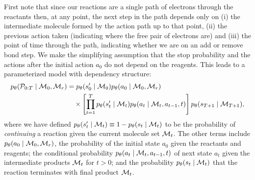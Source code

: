 First note that since our reactions are a single path of electrons through the reactants then, at any point, the next step in the path depends only on (i) the intermediate molecule formed by the action path up to that point, (ii) the previous action taken (indicating where the free pair of electrons are) and (iii) the point of time through the path, indicating whether we are on an add or remove bond step. 
We make the simplifying assumption that the stop probability and the actions after the initial action $a_0$ do not depend on the reagents. This leads to a parameterized model with dependency structure:
\begin{align}
\label{eq:jointprob}
p_\theta({\mathcal{P}}_{0:T} \mid {\mathcal{M}}_0, {\mathcal{M}}_r) 
&=
	p_\theta(s'_0 \mid {\mathcal{M}}_0)
	p_\theta(a_0 \mid {\mathcal{M}}_0, {\mathcal{M}}_r)\\ \nonumber &\quad \times
	\left[\prod_{t=1}^{T}
		p_\theta(s_{t}' \mid {\mathcal{M}}_{t})
		p_\theta(a_t \mid {\mathcal{M}}_{t}, a_{t-1}, t)
	\right]
	p_\theta(s_{T+1} \mid {\mathcal{M}}_{T+1})
	,
\end{align}
where we have defined $p_\theta(s'_t \mid {\mathcal{M}}_t) \equiv 1 - p_\theta(s_t \mid {\mathcal{M}}_t)$ to be the probability of {\em continuing} a reaction given the current molecule set ${\mathcal{M}}_t$.
The other terms include $p_\theta(a_0 \mid {\mathcal{M}}_0, {\mathcal{M}}_r)$, the probability of the initial state $a_0$ given the reactants and reagents; 
the conditional probability $p_\theta(a_t \mid  {\mathcal{M}}_t, a_{t-1}, t)$ 
of next state $a_t$ given the intermediate products ${\mathcal{M}}_t$ for $t > 0$;
and the probability $p_\theta(s_t \mid {\mathcal{M}}_t)$ that the reaction terminates with final product ${\mathcal{M}}_{t}$.

%
%
%

